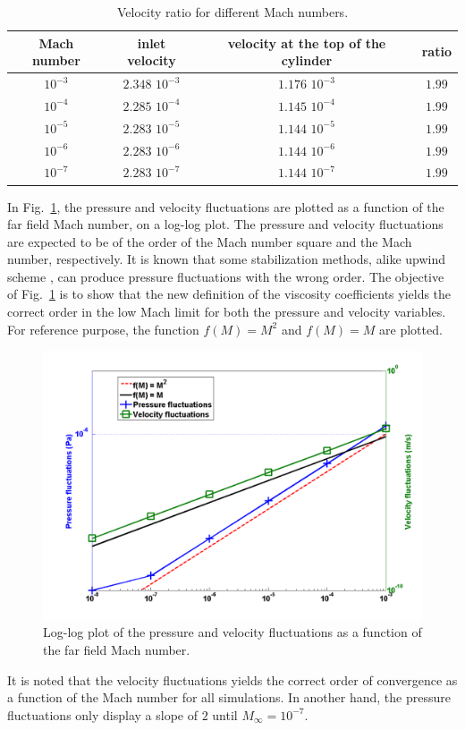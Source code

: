 \documentclass[preprint,10pt]{elsarticle}
\newcommand{\fig}[1]{Fig.~\ref{#1}}                      %
\begin{document}
\begin{table}[H]
\begin{center}
 \caption{\label{tbl:velocity_ratio}Velocity ratio for different Mach numbers.}
\begin{tabular}{|c|c|c|c|}
\hline
Mach number & inlet velocity & velocity at the top of the cylinder & ratio \\ \hline
$10^{-3}$ & $2.348$ $10^{-3}$ & $1.176$ $10^{-3}$& $1.99$ \\ \hline
$10^{-4}$ & $2.285$ $10^{-4}$ & $1.145$ $10^{-4}$& $1.99$ \\ \hline
$10^{-5}$ & $2.283$ $10^{-5}$ & $1.144$ $10^{-5}$ & $1.99$ \\ \hline
$10^{-6}$ & $2.283$ $10^{-6}$ & $1.144$ $10^{-6}$ & $1.99$ \\ \hline
$10^{-7}$ & $2.283$ $10^{-7}$ & $1.144$ $10^{-7}$ & $1.99$ \\ \hline
\end{tabular}
\end{center}
\nonumber
\end{table}
In \fig{fig:pressure_vel_fluc}, the pressure and velocity fluctuations are plotted as a function of the far field Mach number, on a log-log plot. The pressure and velocity fluctuations are expected to be of the order of the Mach number square and the Mach number, respectively. It is known that some stabilization methods, alike upwind scheme \cite{guillard}, can produce pressure fluctuations with the wrong order. The objective of \fig{fig:pressure_vel_fluc} is to show that the new definition of the viscosity coefficients yields the correct order in the low Mach limit for both the pressure and velocity variables. For reference purpose, the function $f(M) = M^2$ and $f(M)=M$ are plotted.  
\begin{figure}[H]
\centering
\includegraphics[width=\textwidth]{pressure_fluctuation.png}
\caption{Log-log plot of the pressure and velocity fluctuations as a function of the far field Mach number.}
\label{fig:pressure_vel_fluc}
\end{figure}
It is noted that the velocity fluctuations yields the correct order of convergence as a function of the Mach number for all simulations. In another hand, the pressure fluctuations only display a slope of $2$ until $M_\infty = 10^{-7}$.
\end{document}
